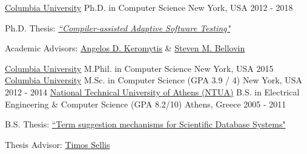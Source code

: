 

\begin{cventries}

  \cventry
    {\href{http://www.cs.columbia.edu/}{Columbia University}}
    {Ph.D. in Computer Science}
    {New York, USA}
    {2012 - 2018}
    {
      \begin{cvitems}
     \item{Ph.D. Thesis: \href{https://academiccommons.columbia.edu/doi/10.7916/D8M05NGN}{\textit{``Compiler-assisted Adaptive Software Testing"}}}
      \item{Academic Advisors: \href{https://www.cs.columbia.edu/~angelos} {Angelos D. Keromytis} \& \href{https://www.cs.columbia.edu/~smb/} {Steven M. Bellovin}}
      \end{cvitems}
    }
  \cventry
    {\href{http://www.cs.columbia.edu/}{Columbia University}}
    {M.Phil. in Computer Science}
    {New York, USA}
    {2015}
    {}
  \cventry
    {\href{http://www.cs.columbia.edu/}{Columbia University}}
    {M.Sc. in Computer Science (GPA 3.9 / 4)}
    {New York, USA}
    {2012 - 2014}
    {}
  \cventry
    {\href{http://www.ece.ntua.gr/}{National Technical University of Athens (NTUA)}}
    {B.S. in Electrical Engineering \& Computer Science (GPA 8.2/10)}
    {Athens, Greece}
    {2005 - 2011}
    {
      \begin{cvitems}
      \item{B.S. Thesis: \href{http://www.dbnet.ece.ntua.gr/pubs/uploads/DIPL-2011-7.pdf}{``Term suggestion mechanisms for Scientific Database Systems"}}
       \item{Thesis Advisor: \href{https://scholar.google.gr/citations?user=G1Iux80AAAAJ} {Timos Sellis}}
      \end{cvitems}
    }

\end{cventries}
